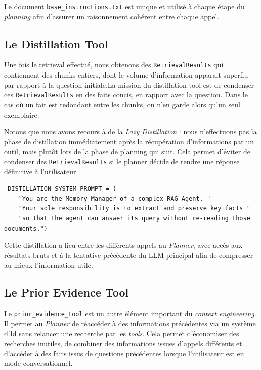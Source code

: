 Le document \texttt{base\_instructions.txt} est unique et utilisé à chaque étape du \textit{planning} afin d'assurer un raisonnement cohérent entre chaque appel.

\subsection{Le Distillation Tool}
Une fois le retrieval effectué, nous obtenons des \texttt{RetrievalResults} qui contiennent des chunks entiers, dont le volume d'information apparait superflu par rapport à la question initiale.La mission du distillation tool est de condenser ces \texttt{RetrievalResults} en des faits concis, en rapport avec la question. Dans le cas où un fait est redondant entre les chunks, on n'en garde alors qu'un seul exemplaire.

Notons que nous avons recours à de la \textit{Lazy Distillation} : nous n'effectuons pas la phase de distillation immédiatement après la récupération d'informations par un outil, mais plutôt lors de la phase de planning qui suit. Cela permet d'éviter de condenser des \texttt{RetrievalResults} si le planner décide de rendre une réponse définitive à l'utilisateur.

\begin{lstlisting}
_DISTILLATION_SYSTEM_PROMPT = (
    "You are the Memory Manager of a complex RAG Agent. "
    "Your sole responsibility is to extract and preserve key facts "
    "so that the agent can answer its query without re-reading those documents.")
\end{lstlisting}

Cette distillation a lieu entre les différents appels au \textit{Planner}, avec accès aux  résultats bruts et à la tentative précédente du LLM principal afin de compresser au mieux l'information utile.

\subsection{Le Prior Evidence Tool}
Le \texttt{prior\_evidence\_tool} est un autre élément important du \textit{context engineering}. Il permet au \textit{Planner} de réaccéder à des informations précédentes via un système d'Id sans relancer une recherche par les \textit{tools}. 
Cela permet d'économiser des recherches inutiles, de combiner des informations issues d'appels différents et d'accéder à des faits issus de questions précédentes lorsque l'utilisateur est en mode conversationnel.

